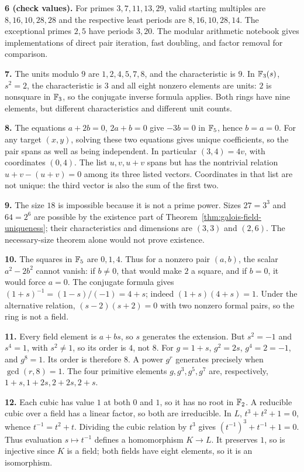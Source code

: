 \textbf{6 (check values).} For primes $3,7,11,13,29$, valid starting
multiples are $8,16,10,28,28$ and the respective least periods are
$8,16,10,28,14$. The exceptional primes $2,5$ have periods $3,20$.
The modular arithmetic notebook gives implementations of direct pair
iteration, fast doubling, and factor removal for comparison.

\textbf{7.} The units modulo $9$ are $1,2,4,5,7,8$, and the
characteristic is $9$. In $\mathbb F_3(s)$, $s^2=2$, the characteristic is
$3$ and all eight nonzero elements are units: $2$ is nonsquare in
$\mathbb F_3$, so the conjugate inverse formula applies. Both rings have
nine elements, but different characteristics and different unit counts.

\textbf{8.} The equations $a+2b=0$, $2a+b=0$ give $-3b=0$ in
$\mathbb F_5$, hence $b=a=0$. For any target $(x,y)$, solving these two
equations gives unique coefficients, so the pair spans as well as
being independent. In particular $(3,4)=4v$, with coordinates $(0,4)$.
The list $u,v,u+v$ spans but has the nontrivial relation
$u+v-(u+v)=0$ among its three listed vectors. Coordinates in that
list are not unique: the third vector is also the sum of the first two.

\textbf{9.} The size $18$ is impossible because it is not a prime
power. Sizes $27=3^3$ and $64=2^6$ are possible by the existence part
of Theorem~\ref{thm:galois-field-uniqueness}; their characteristics and
dimensions are $(3,3)$ and $(2,6)$. The necessary-size theorem alone
would not prove existence.

\textbf{10.} The squares in $\mathbb F_5$ are $0,1,4$. Thus for a nonzero
pair $(a,b)$, the scalar $a^2-2b^2$ cannot vanish: if $b\ne0$, that
would make $2$ a square, and if $b=0$, it would force $a=0$.
The conjugate formula gives $(1+s)^{-1}=(1-s)/(-1)=4+s$;
indeed $(1+s)(4+s)=1$. Under the alternative relation,
$(s-2)(s+2)=0$ with two nonzero formal pairs, so the ring is not a field.

\textbf{11.} Every field element is $a+bs$, so $s$ generates the
extension. But $s^2=-1$ and $s^4=1$, with $s^2\ne1$, so its order
is $4$, not $8$. For $g=1+s$, $g^2=2s$, $g^4=2=-1$, and $g^8=1$.
Its order is therefore $8$. A power $g^r$ generates precisely when
$\gcd(r,8)=1$. The four primitive elements $g,g^3,g^5,g^7$ are,
respectively, $1+s,1+2s,2+2s,2+s$.

\textbf{12.} Each cubic has value $1$ at both $0$ and $1$, so it
has no root in $\mathbb F_2$. A reducible cubic over a field has a linear
factor, so both are irreducible. In $L$, $t^3+t^2+1=0$, whence
$t^{-1}=t^2+t$. Dividing the cubic relation by $t^3$ gives
$(t^{-1})^3+t^{-1}+1=0$. Thus evaluation $s\mapsto t^{-1}$ defines
a homomorphism $K\to L$. It preserves $1$, so is injective since
$K$ is a field; both fields have eight elements, so it is an isomorphism.


